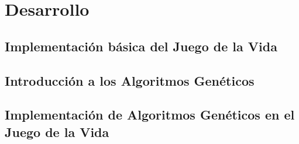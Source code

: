 \section{Desarrollo}
\subsection{Implementación básica del Juego de la Vida}



\subsection{Introducción a los Algoritmos Genéticos}



\subsection{Implementación de Algoritmos Genéticos en el Juego de la Vida}
